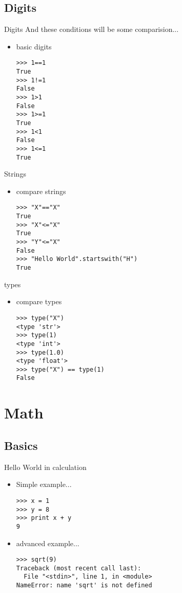 \documentclass[hyperref={pdfpagelabels=false}]{beamer}
\begin{document}
    \subsection{Digits}
		\begin{frame}[fragile]{Digits}
            And these conditions will be some comparision...
			\begin{itemize}
                \item<1-> basic digits
\begin{lstlisting}
>>> 1==1
True
>>> 1!=1
False
>>> 1>1
False
>>> 1>=1
True
>>> 1<1
False
>>> 1<=1
True
\end{lstlisting}
            \end{itemize}
		\end{frame}
		\begin{frame}[fragile]{Strings}
			\begin{itemize}
                \item<1-> compare strings
\begin{lstlisting}
>>> "X"=="X"
True
>>> "X"<="X"
True
>>> "Y"<="X"
False
>>> "Hello World".startswith("H")
True
\end{lstlisting}
            \end{itemize}
		\end{frame}
		\begin{frame}[fragile]{types}
			\begin{itemize}
                \item<1-> compare types
\begin{lstlisting}
>>> type("X")
<type 'str'>
>>> type(1)
<type 'int'>
>>> type(1.0)
<type 'float'>
>>> type("X") == type(1)
False
\end{lstlisting}
            \end{itemize}
		\end{frame}
\section{Math}
    \subsection{Basics}
		\begin{frame}[fragile]{Hello World in calculation}
			\begin{itemize}
                \item<1-> Simple example...
                \begin{lstlisting}
>>> x = 1
>>> y = 8
>>> print x + y
9
\end{lstlisting}
                \item<1-> advanced example...
                \begin{lstlisting}
>>> sqrt(9)
Traceback (most recent call last):
  File "<stdin>", line 1, in <module>
NameError: name 'sqrt' is not defined
\end{lstlisting}
            \end{itemize}
		\end{frame}
\end{document}
